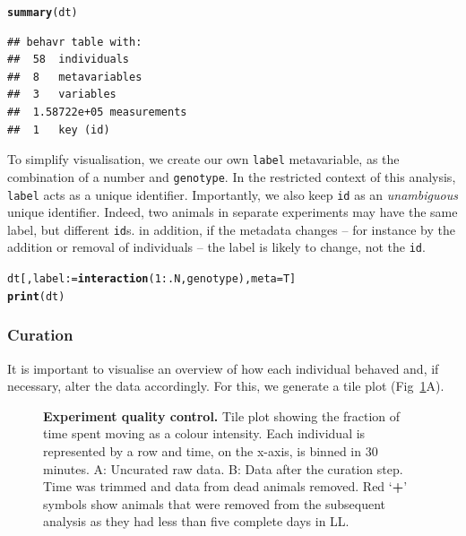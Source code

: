 \documentclass[10pt,letterpaper]{article}\usepackage[]{graphicx}\usepackage[]{color}
\makeatletter
\newcommand{\hlnum}[1]{\textcolor[rgb]{0.686,0.059,0.569}{#1}}%
\newcommand{\hlopt}[1]{\textcolor[rgb]{0,0,0}{#1}}%
\newcommand{\hlstd}[1]{\textcolor[rgb]{0.345,0.345,0.345}{#1}}%
\newcommand{\hlkwb}[1]{\textcolor[rgb]{0.69,0.353,0.396}{#1}}%
\newcommand{\hlkwc}[1]{\textcolor[rgb]{0.333,0.667,0.333}{#1}}%
\newcommand{\hlkwd}[1]{\textcolor[rgb]{0.737,0.353,0.396}{\textbf{#1}}}%
\newenvironment{kframe}{%
 \def\at@end@of@kframe{}%
 \ifinner\ifhmode%
  \def\at@end@of@kframe{\end{minipage}}%
  \begin{minipage}{\columnwidth}%
 \fi\fi%
 \def\FrameCommand##1{\hskip\@totalleftmargin \hskip-\fboxsep
 \colorbox{shadecolor}{##1}\hskip-\fboxsep
     \hskip-\linewidth \hskip-\@totalleftmargin \hskip\columnwidth}%
 \MakeFramed {\advance\hsize-\width
   \@totalleftmargin\z@ \linewidth\hsize
   \@setminipage}}%
 {\par\unskip\endMakeFramed%
 \at@end@of@kframe}
\newenvironment{knitrout}{}{} %
\makeatother
\begin{document}
\begin{knitrout}
\color{fgcolor}\begin{kframe}
\begin{alltt}
\hlkwd{summary}\hlstd{(dt)}
\end{alltt}
\begin{verbatim}
## behavr table with:
##  58	individuals
##  8	metavariables
##  3	variables
##  1.58722e+05	measurements
##  1	key (id)
\end{verbatim}
\end{kframe}
\end{knitrout}

To simplify visualisation, we create our own \texttt{label} metavariable, as the combination of a number and \texttt{genotype}.
In the restricted context of this analysis, \texttt{label} acts as a unique identifier.
Importantly, we also keep \texttt{id} as an \emph{unambiguous} unique identifier.
Indeed, two animals in separate experiments may have the same label, but different \texttt{id}s.
in addition, if the metadata changes -- for instance by the addition or removal of individuals -- the label is likely to change, not the \texttt{id}.




\begin{knitrout}
\color{fgcolor}\begin{kframe}
\begin{alltt}
\hlstd{dt[, label} \hlkwb{:=} \hlkwd{interaction}\hlstd{(}\hlnum{1}\hlopt{:}\hlstd{.N, genotype),} \hlkwc{meta} \hlstd{= T]}
\hlkwd{print}\hlstd{(dt)}
\end{alltt}
\end{kframe}
\end{knitrout}


\subsubsection*{Curation}
It is important to visualise an overview of how each individual behaved and, if necessary, alter the data accordingly. For this, we generate a tile plot (Fig~\ref{fig:fig-3}A).

\begin{figure}[!h]
	\caption{{\bf Experiment quality control.}
			Tile plot showing the fraction of time spent moving as a colour intensity.
			Each individual is represented by a row and time, on the x-axis, is binned in 30 minutes.
			A: Uncurated raw data.
			B: Data after the curation step. Time was trimmed and data from dead animals removed. 
			Red `\textbf{+}' symbols show animals that were removed from the subsequent analysis as they had less than five complete days in LL.}
	\label{fig:fig-3}
\end{figure}
\end{document}
